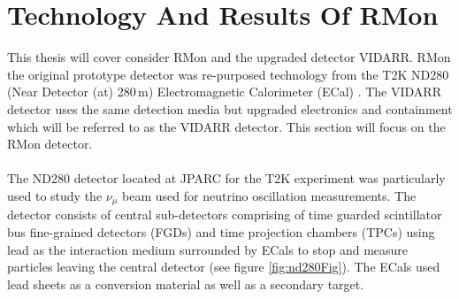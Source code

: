\section{Technology And Results Of RMon}
This thesis will cover consider RMon and the upgraded detector VIDARR. RMon the original prototype detector was re-purposed technology from the T2K ND280 (Near Detector (at) 280\,m) Electromagnetic Calorimeter (ECal) \cite{Allan_2013}. The VIDARR detector uses the same detection media but upgraded electronics and containment which will be referred to as the VIDARR detector. This section will focus on the RMon detector.
\\\\The ND280 detector located at JPARC for the T2K experiment was particularly used to study the $\nu_\mu$ beam used for neutrino oscillation measurements. The detector consists of central sub-detectors comprising of time guarded scintillator bus fine-grained detectors (FGDs) and time projection chambers (TPCs) using lead as the interaction medium surrounded by ECals to stop and measure particles leaving the central detector (see figure \ref{fig:nd280Fig}). The ECals used lead sheets as a conversion material as well as a secondary target. 

